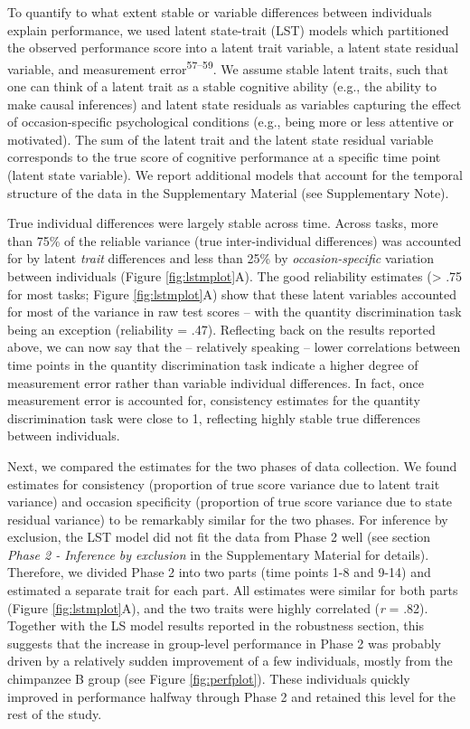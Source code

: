 \documentclass[
  man,floatsintext]{apa6}
\begin{document}
To quantify to what extent stable or variable differences between individuals explain performance, we used latent state-trait (LST) models which partitioned the observed performance score into a latent trait variable, a latent state residual variable, and measurement error\textsuperscript{57--59}. We assume stable latent traits, such that one can think of a latent trait as a stable cognitive ability (e.g., the ability to make causal inferences) and latent state residuals as variables capturing the effect of occasion-specific psychological conditions (e.g., being more or less attentive or motivated). The sum of the latent trait and the latent state residual variable corresponds to the true score of cognitive performance at a specific time point (latent state variable). We report additional models that account for the temporal structure of the data in the Supplementary Material (see Supplementary Note).

True individual differences were largely stable across time. Across tasks, more than 75\% of the reliable variance (true inter-individual differences) was accounted for by latent \emph{trait} differences and less than 25\% by \emph{occasion-specific} variation between individuals (Figure \ref{fig:lstmplot}A). The good reliability estimates (\textgreater{} .75 for most tasks; Figure \ref{fig:lstmplot}A) show that these latent variables accounted for most of the variance in raw test scores -- with the quantity discrimination task being an exception (reliability = .47). Reflecting back on the results reported above, we can now say that the -- relatively speaking -- lower correlations between time points in the quantity discrimination task indicate a higher degree of measurement error rather than variable individual differences. In fact, once measurement error is accounted for, consistency estimates for the quantity discrimination task were close to 1, reflecting highly stable true differences between individuals.

Next, we compared the estimates for the two phases of data collection. We found estimates for consistency (proportion of true score variance due to latent trait variance) and occasion specificity (proportion of true score variance due to state residual variance) to be remarkably similar for the two phases. For inference by exclusion, the LST model did not fit the data from Phase 2 well (see section \emph{Phase 2 - Inference by exclusion} in the Supplementary Material for details). Therefore, we divided Phase 2 into two parts (time points 1-8 and 9-14) and estimated a separate trait for each part. All estimates were similar for both parts (Figure \ref{fig:lstmplot}A), and the two traits were highly correlated (\emph{r} = .82). Together with the LS model results reported in the robustness section, this suggests that the increase in group-level performance in Phase 2 was probably driven by a relatively sudden improvement of a few individuals, mostly from the chimpanzee B group (see Figure \ref{fig:perfplot}). These individuals quickly improved in performance halfway through Phase 2 and retained this level for the rest of the study.
\end{document}
